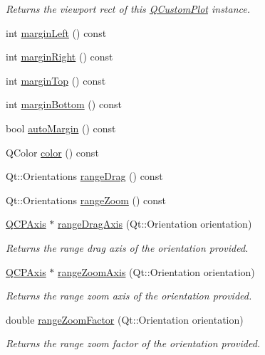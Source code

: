 \begin{DoxyCompactItemize}
\begin{DoxyCompactList}\small\item\em Returns the viewport rect of this \hyperlink{a00030_d8/d00/a00186}{Q\+Custom\+Plot} instance. \end{DoxyCompactList}\item 
int \hyperlink{a00116_ae58a601ccf3bfb4a4f05ad2c30cf3f7b}{margin\+Left} () const 
\item 
int \hyperlink{a00116_a8e815aa0d9167e8eee7fde2b9543aeee}{margin\+Right} () const 
\item 
int \hyperlink{a00116_a56fe549a0ee79bcce78d4167eb47ea7b}{margin\+Top} () const 
\item 
int \hyperlink{a00116_aacbbba4878b8011eac2d51c346734458}{margin\+Bottom} () const 
\item 
bool \hyperlink{a00116_a2bfd7565f3ef76ca1fd87869999ae2c1}{auto\+Margin} () const 
\item 
Q\+Color \hyperlink{a00116_ae35093fbf4f645dcefd930ca8c68b622}{color} () const 
\item 
Qt\+::\+Orientations \hyperlink{a00116_aa510cedc21252e5b8cf940b5414091fd}{range\+Drag} () const 
\item 
Qt\+::\+Orientations \hyperlink{a00116_a211b556064a5a2ebc8bf79f03d57f66c}{range\+Zoom} () const 
\item 
\hyperlink{a00025}{Q\+C\+P\+Axis} $\ast$ \hyperlink{a00116_a0e0923c32c4b71509afc26062d3e625d}{range\+Drag\+Axis} (Qt\+::\+Orientation orientation)
\begin{DoxyCompactList}\small\item\em Returns the range drag axis of the {\itshape orientation} provided. \end{DoxyCompactList}\item 
\hyperlink{a00025}{Q\+C\+P\+Axis} $\ast$ \hyperlink{a00116_a81c0f9cdb32b2afc1fc07440c9f3fa7b}{range\+Zoom\+Axis} (Qt\+::\+Orientation orientation)
\begin{DoxyCompactList}\small\item\em Returns the range zoom axis of the {\itshape orientation} provided. \end{DoxyCompactList}\item 
double \hyperlink{a00116_ad833d4bd16c7b27621abd373db72d33a}{range\+Zoom\+Factor} (Qt\+::\+Orientation orientation)
\begin{DoxyCompactList}\small\item\em Returns the range zoom factor of the {\itshape orientation} provided. \end{DoxyCompactList}\item 

\end{DoxyCompactItemize}
